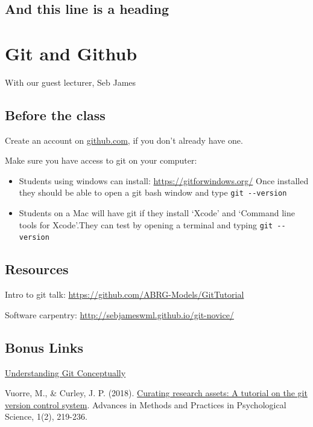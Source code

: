 \documentclass[]{book}
\providecommand{\tightlist}{%
  \setlength{\itemsep}{0pt}\setlength{\parskip}{0pt}}
\begin{document}
\section{And this line is a heading}\label{and-this-line-is-a-heading}

\chapter{Git and Github}\label{git-and-github}

With our guest lecturer, Seb James

\section{Before the class}\label{before-the-class}

Create an account on \href{https://github.com/}{github.com}, if you
don't already have one.

Make sure you have access to git on your computer:

\begin{itemize}
\tightlist
\item
  Students using windows can install: \url{https://gitforwindows.org/}
  Once installed they should be able to open a git bash window and type
  \texttt{git\ -\/-version}
\item
  Students on a Mac will have git if they install `Xcode' and `Command
  line tools for Xcode'.They can test by opening a terminal and typing
  \texttt{git\ -\/-version}
\end{itemize}

\section{Resources}\label{resources}

Intro to git talk: \url{https://github.com/ABRG-Models/GitTutorial}

Software carpentry: \url{http://sebjameswml.github.io/git-novice/}

\section{Bonus Links}\label{bonus-links}

\href{https://www.sbf5.com/~cduan/technical/git/}{Understanding Git
Conceptually}

Vuorre, M., \& Curley, J. P. (2018).
\href{https://journals.sagepub.com/doi/full/10.1177/2515245918754826}{Curating
research assets: A tutorial on the git version control system}. Advances
in Methods and Practices in Psychological Science, 1(2), 219-236.
\end{document}
